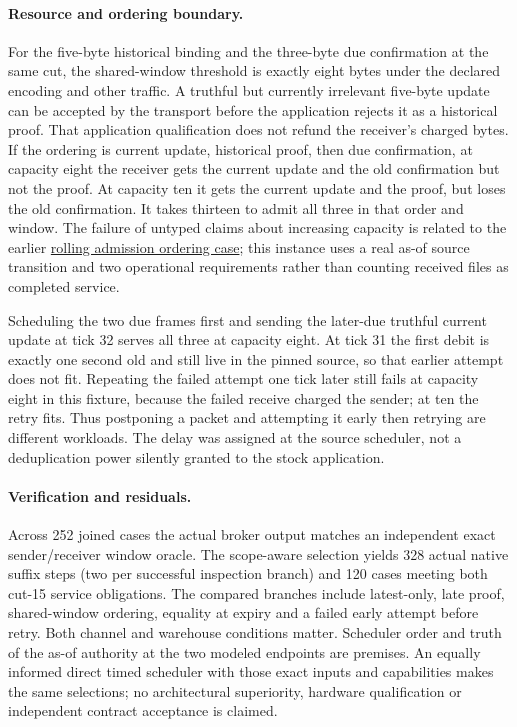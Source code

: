 \documentclass{article}
\begin{document}
\paragraph{Resource and ordering boundary.}
For the five-byte historical binding and the three-byte
due confirmation at the same cut, the shared-window threshold
is exactly eight bytes under the declared encoding and other
traffic. A truthful but currently irrelevant five-byte update
can be accepted by the transport before the application
rejects it as a historical proof. That application
qualification does not refund the receiver's charged bytes.
If the ordering is current update, historical proof, then
due confirmation, at capacity eight the receiver gets the
current update and the old confirmation but not the proof.
At capacity ten it gets the current update and the proof,
but loses the old confirmation. It takes thirteen to admit
all three in that order and window. The failure of untyped
claims about increasing capacity is related to the earlier
\href{https://github.com/eternal-november/eos-research-programmes/pull/722}
{rolling admission ordering case}; this instance uses a real
as-of source transition and two operational requirements
rather than counting received files as completed service.

Scheduling the two due frames first and sending the later-due
truthful current update at tick 32 serves all three at
capacity eight. At tick 31 the first debit is exactly one
second old and still live in the pinned source, so that
earlier attempt does not fit. Repeating the failed attempt
one tick later still fails at capacity eight in this
fixture, because the failed receive charged the sender;
at ten the retry fits. Thus postponing a packet and
attempting it early then retrying are different workloads.
The delay was assigned at the source scheduler, not a
deduplication power silently granted to the stock application.

\paragraph{Verification and residuals.}
Across 252 joined cases the actual broker output matches
an independent exact sender/receiver window oracle.
The scope-aware selection yields 328 actual native suffix
steps (two per successful inspection branch) and 120
cases meeting both cut-15 service obligations.
The compared branches include latest-only, late proof,
shared-window ordering, equality at expiry and a failed
early attempt before retry. Both channel and warehouse
conditions matter. Scheduler order and truth of the
as-of authority at the two modeled endpoints are premises.
An equally informed direct timed scheduler with those exact
inputs and capabilities makes the same selections; no
architectural superiority, hardware qualification or
independent contract acceptance is claimed.
\end{document}
